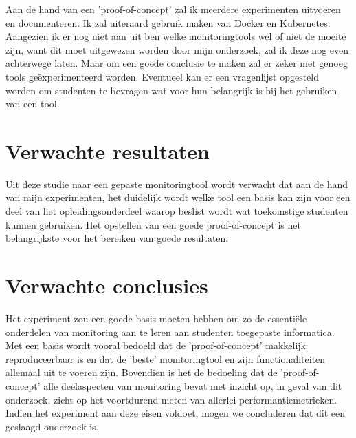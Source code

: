 Aan de hand van een 'proof-of-concept' zal ik meerdere experimenten uitvoeren en documenteren. Ik zal uiteraard gebruik maken van Docker en Kubernetes. Aangezien ik er nog niet aan uit ben welke monitoringtools wel of niet de moeite zijn, want dit moet uitgewezen worden door mijn onderzoek, zal ik deze nog even achterwege laten. Maar om een goede conclusie te maken zal er zeker met genoeg tools geëxperimenteerd worden. Eventueel kan er een vragenlijst opgesteld worden om studenten te bevragen wat voor hun belangrijk is bij het gebruiken van een tool.

\section{Verwachte resultaten}
\label{sec:verwachte_resultaten}

Uit deze studie naar een gepaste monitoringtool wordt verwacht dat aan de hand van mijn experimenten, het duidelijk wordt welke tool een basis kan zijn voor een deel van het opleidingsonderdeel waarop beslist wordt wat toekomstige studenten kunnen gebruiken. Het opstellen van een goede proof-of-concept is het belangrijkste voor het bereiken van goede resultaten.

\section{Verwachte conclusies}
\label{sec:verwachte_conclusies}

Het experiment zou een goede basis moeten hebben om zo de essentiële onderdelen van monitoring aan te leren aan studenten toegepaste informatica. Met een basis wordt vooral bedoeld dat de 'proof-of-concept' makkelijk reproduceerbaar is en dat de 'beste' monitoringtool en zijn functionaliteiten allemaal uit te voeren zijn. Bovendien is het de bedoeling dat de 'proof-of-concept' alle deelaspecten van monitoring bevat met inzicht op, in geval van dit onderzoek, zicht op het voortdurend meten van allerlei performantiemetrieken. Indien het experiment aan deze eisen voldoet, mogen we concluderen dat dit een geslaagd onderzoek is.

